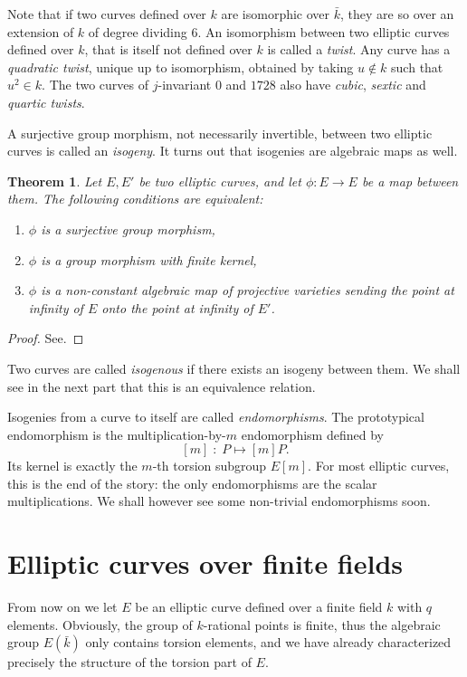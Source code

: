 \documentclass[10pt]{article}
\theoremstyle{plain}
\newtheorem{theorem}{Theorem}
\theoremstyle{definition}
\begin{document}
Note that if two curves defined over $k$ are isomorphic over
$\bar{k}$, they are so over an extension of $k$ of degree dividing
$6$. %
An isomorphism between two elliptic curves defined over $k$, that is
itself not defined over $k$ is called a \emph{twist}. %
Any curve has a \emph{quadratic twist}, unique up to isomorphism,
obtained by taking $u∉k$ such that $u^2∈k$. %
The two curves of $j$-invariant $0$ and $1728$ also have \emph{cubic},
\emph{sextic} and \emph{quartic twists}.

A surjective group morphism, not necessarily invertible, between two
elliptic curves is called an \emph{isogeny}. %
It turns out that isogenies are algebraic maps as well.

\begin{theorem}
  Let $E,E'$ be two elliptic curves, and let $\phi:E→E$ be a map between
  them. %
  The following conditions are equivalent:
  \begin{enumerate}
  \item $\phi$ is a surjective group morphism,
  \item $\phi$ is a group morphism with finite kernel,
  \item $\phi$ is a non-constant algebraic map of projective varieties
    sending the point at infinity of $E$ onto the point at infinity of
    $E'$.
  \end{enumerate}
\end{theorem}
\begin{proof}
  See\cite[III, Th.~4.8]{silverman:elliptic}.
\end{proof}

Two curves are called \emph{isogenous} if there exists an isogeny
between them. %
We shall see in the next part that this is an equivalence relation.

Isogenies from a curve to itself are called \emph{endomorphisms}. %
The prototypical endomorphism is the multiplication-by-$m$
endomorphism defined by
\[[m]\;:\; P \mapsto [m]P.\] %
Its kernel is exactly the $m$-th torsion subgroup $E[m]$. %
For most elliptic curves, this is the end of the story: the only
endomorphisms are the scalar multiplications. %
We shall however see some non-trivial endomorphisms soon.


\section{Elliptic curves over finite fields}

From now on we let $E$ be an elliptic curve defined over a finite
field $k$ with $q$ elements. %
Obviously, the group of $k$-rational points is finite, thus the
algebraic group $E(\bar{k})$ only contains torsion elements, and we
have already characterized precisely the structure of the torsion part
of $E$.
\end{document}
